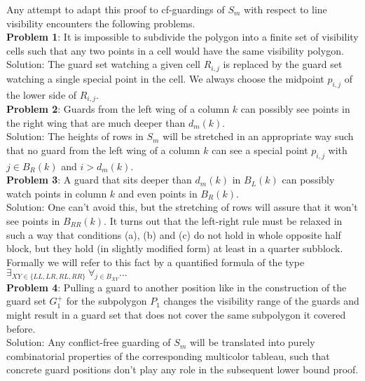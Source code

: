 \documentclass[a4paper,USenglish,numberwithinsect]{lipics}
\theoremstyle{plain}
\begin{document}
Any attempt to adapt  this proof to cf-guardings of $S_m$
with respect to line
visibility encounters the following  problems. \\
{\bf  Problem 1}: It is impossible to subdivide the polygon into a finite set of
visibility cells such that any two points
in a cell would have the same visibility polygon.\\
Solution: The guard set watching a given cell $R_{i,j}$ is replaced by
the guard set watching a  single special
point in the cell.
We always choose the midpoint $p_{i,j}$ of the lower side of $R_{i,j}$.\\
{\bf  Problem 2}: Guards from the left wing of a column $k$ can possibly see points
in the right wing that are much deeper than
$d_m(k)$.\\
Solution:
 The heights of  rows in $S_m$ will be stretched in an
appropriate way such that no
guard from the left wing of a column $k$ can see a special  point $p_{i,j}$ with
$j \in B_R(k)$ and $i > d_m(k)$.\\
{\bf  Problem 3}: A guard that sits deeper than $d_m(k)$ in  $B_L(k)$ can possibly watch
points in column $k$ and even points in $B_R(k)$.\\
Solution: One can't avoid this, but the stretching of  rows will assure that it won't see
points in $B_{RR}(k)$.
It turns out that the left-right rule must be relaxed in such a way that
conditions (a), (b) and (c)
do not hold in whole opposite half block, but they hold (in slightly
modified form) at least in a quarter
subblock. Formally we will refer to this fact by a quantified formula of
the type
$\exists_{ XY \in \{LL,LR,RL,RR\}} \ \forall_{ j \in B_{XY}} \ldots$\\
{\bf  Problem 4}: Pulling a guard to another position like in the construction of
the guard set $G_1^{+}$ for the subpolygon $P_1$
changes the visibility range of the guards and might result in a guard
set that does not cover the same subpolygon it
covered before.\\
Solution: Any conflict-free guarding of $S_m$ will be translated into  purely
combinatorial properties of
the corresponding multicolor tableau, such that
concrete  guard positions don't play any role in the subsequent lower bound proof.
\end{document}
